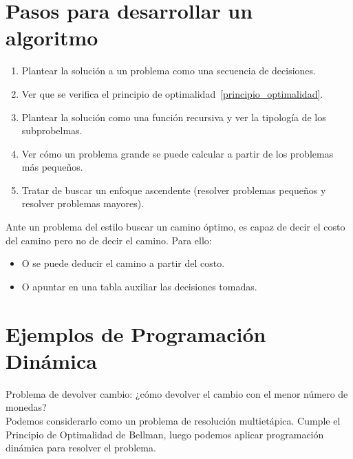 \section{Pasos para desarrollar un algoritmo}
\begin{enumerate}
    \item Plantear la solución a un problema como una secuencia de decisiones.
    \item Ver que se verifica el principio de optimalidad~\ref{principio_optimalidad}.
    \item Plantear la solución como una función recursiva y ver la tipología de los subprobelmas.
    \item Ver cómo un problema grande se puede calcular a partir de los problemas más pequeños.
    \item Tratar de buscar un enfoque ascendente (resolver problemas pequeños y resolver problemas mayores).
\end{enumerate}
Ante un problema del estilo buscar un camino óptimo, es capaz de decir el costo del camino pero no de decir el camino. Para ello:
\begin{itemize}
    \item O se puede deducir el camino a partir del costo.
    \item O apuntar en una tabla auxiliar las decisiones tomadas.
\end{itemize}

\section{Ejemplos de Programación Dinámica}
\begin{ejemplo}
    Problema de devolver cambio: ¿cómo devolver el cambio con el menor número de monedas?\\

    Podemos considerarlo como un problema de resolución multietápica. Cumple el Principio de Optimalidad de Bellman, luego podemos aplicar programación dinámica para resolver el problema.

\end{ejemplo}

